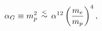 \begin{equation}
 \alpha_G \equiv m_p^2 \, \stackrel{<}{\sim} \,
  \alpha^{12}\left({m_e\over m_p}\right)^4,
 \label{eq:1}
 \end{equation}

